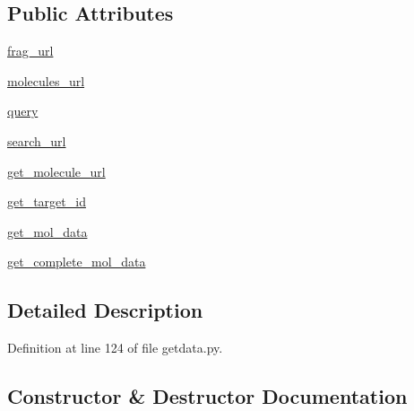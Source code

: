 \subsection*{Public Attributes}
\begin{DoxyCompactItemize}
\item 
\hyperlink{classfragalysis__api_1_1xcextracter_1_1getdata_1_1_get_molecules_data_a3a27004f4ee3a723e84d65065f0a1c6c}{frag\+\_\+url}
\item 
\hyperlink{classfragalysis__api_1_1xcextracter_1_1getdata_1_1_get_molecules_data_a01793eb7293e0ae72bbf87afc2105b99}{molecules\+\_\+url}
\item 
\hyperlink{classfragalysis__api_1_1xcextracter_1_1getdata_1_1_get_molecules_data_a7c5fd4724cd4758048ae1a6974341ffa}{query}
\item 
\hyperlink{classfragalysis__api_1_1xcextracter_1_1getdata_1_1_get_molecules_data_ac2b899060aa81350219dcca84a0393e9}{search\+\_\+url}
\item 
\hyperlink{classfragalysis__api_1_1xcextracter_1_1getdata_1_1_get_molecules_data_acc15aef3cffb79b292088e22c876f300}{get\+\_\+molecule\+\_\+url}
\item 
\hyperlink{classfragalysis__api_1_1xcextracter_1_1getdata_1_1_get_molecules_data_a488df8e18c47c75a3409932a19daaa0f}{get\+\_\+target\+\_\+id}
\item 
\hyperlink{classfragalysis__api_1_1xcextracter_1_1getdata_1_1_get_molecules_data_a4f1564c52821f30324558b7d4205752b}{get\+\_\+mol\+\_\+data}
\item 
\hyperlink{classfragalysis__api_1_1xcextracter_1_1getdata_1_1_get_molecules_data_a10d64bb77ee5a46626b7ee644a48c818}{get\+\_\+complete\+\_\+mol\+\_\+data}
\end{DoxyCompactItemize}


\subsection{Detailed Description}


Definition at line 124 of file getdata.\+py.



\subsection{Constructor \& Destructor Documentation}
\mbox{\label{classfragalysis__api_1_1xcextracter_1_1getdata_1_1_get_molecules_data_a11e4a33bfbb0ff558ef33a0e8a46c76b}} 
